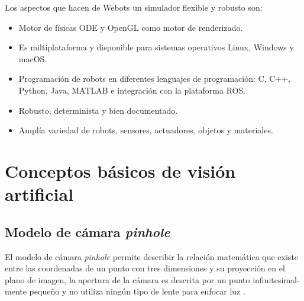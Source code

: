 Los aspectos que hacen de Webots un simulador flexible y robusto son:
\begin{itemize}
    \item Motor de físicas ODE y OpenGL como motor de renderizado.
    \item Es miltiplataforma y disponible para sistemas operativos Linux, Windows y macOS.
    \item Programación de robots en diferentes lenguajes de programación: C, C++, Python, Java, MATLAB e integración con la plataforma ROS.
    \item Robusto, determinista y bien documentado.
    \item Amplía variedad de robots, sensores, actuadores, objetos y materiales.
\end{itemize}



\section{Conceptos básicos de visión artificial} \label{sec:conceptos_básicos_de_visión_artificial}

\subsection{Modelo de cámara \textit{pinhole}} \label{sub:modelo_de_cámara_pinhole}
 
 El modelo de cámara \textit{pinhole} permite describir la relación matemática que existe entre las coordenadas de un punto con tres dimensiones y su proyección en el plano de imagen, la apertura de la cámara es descrita por un punto infinitesimal-mente pequeño y no utiliza ningún tipo de lente para enfocar luz \cite{forsyth2011computer}. 
 
